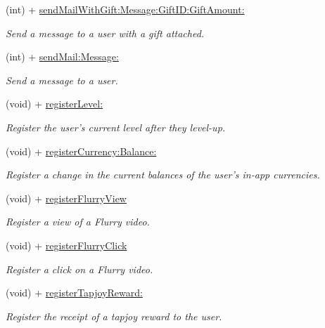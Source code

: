 \begin{DoxyCompactItemize}
(int) + \hyperlink{interface_fuse_a_p_i_ad92f085731243481b9ecefa0d8555408}{send\+Mail\+With\+Gift\+:\+Message\+:\+Gift\+I\+D\+:\+Gift\+Amount\+:}
\begin{DoxyCompactList}\small\item\em Send a message to a user with a gift attached. \end{DoxyCompactList}\item 
(int) + \hyperlink{interface_fuse_a_p_i_a54502c5b37ad033b90c50bfcec461214}{send\+Mail\+:\+Message\+:}
\begin{DoxyCompactList}\small\item\em Send a message to a user. \end{DoxyCompactList}\item 
(void) + \hyperlink{interface_fuse_a_p_i_a37448397d10db8278e2e45d0448c4fa0}{register\+Level\+:}
\begin{DoxyCompactList}\small\item\em Register the user's current level after they level-\/up. \end{DoxyCompactList}\item 
(void) + \hyperlink{interface_fuse_a_p_i_ac07a77edd3b1eeddfe96dba096f15273}{register\+Currency\+:\+Balance\+:}
\begin{DoxyCompactList}\small\item\em Register a change in the current balances of the user's in-\/app currencies. \end{DoxyCompactList}\item 
(void) + \hyperlink{interface_fuse_a_p_i_a48edada43656291d0b5dee4c0acba5f8}{register\+Flurry\+View}
\begin{DoxyCompactList}\small\item\em Register a view of a Flurry video. \end{DoxyCompactList}\item 
(void) + \hyperlink{interface_fuse_a_p_i_a2b50e32ac4e19973bf237def2aae8fb8}{register\+Flurry\+Click}
\begin{DoxyCompactList}\small\item\em Register a click on a Flurry video. \end{DoxyCompactList}\item 
(void) + \hyperlink{interface_fuse_a_p_i_aeef2b5a374224937236bdf820ab18586}{register\+Tapjoy\+Reward\+:}
\begin{DoxyCompactList}\small\item\em Register the receipt of a tapjoy reward to the user. \end{DoxyCompactList}\item 

\end{DoxyCompactItemize}

